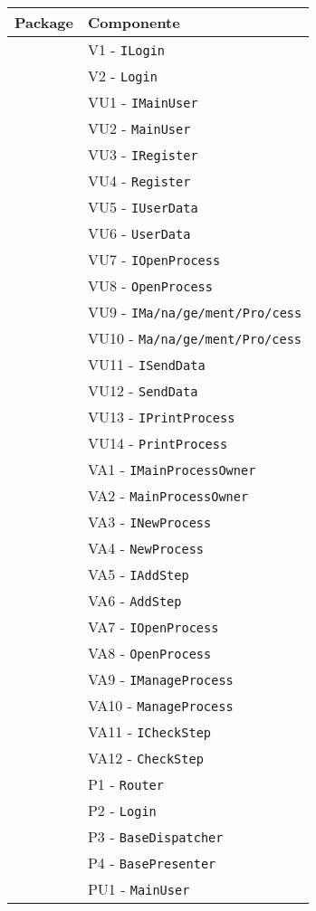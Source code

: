\begin{longtable}{XX}
\toprule
\textbf{Package} & \textbf{Componente}\\
\midrule
\view{}&V1 - \texttt{ILogin}\\ 
&V2 - \texttt{Login}\\ 
\midrule
\viewUser{}&VU1 - \texttt{IMainUser}\\
&VU2 - \texttt{MainUser}\\
&VU3 - \texttt{IRegister}\\
&VU4 - \texttt{Register}\\
&VU5 - \texttt{IUserData}\\
&VU6 - \texttt{UserData}\\
&VU7 - \texttt{IOpenProcess}\\ 
&VU8 - \texttt{OpenProcess}\\ 
&VU9 - \texttt{IMa\fshyp{}na\fshyp{}ge\fshyp{}ment\fshyp{}Pro\fshyp{}cess}\\ 
&VU10 - \texttt{Ma\fshyp{}na\fshyp{}ge\fshyp{}ment\fshyp{}Pro\fshyp{}cess}\\ 
&VU11 - \texttt{ISendData}\\ 
&VU12 - \texttt{SendData}\\
&VU13 - \texttt{IPrintProcess}\\ 
&VU14 - \texttt{PrintProcess}\\ 
\midrule
\viewAdmin{}&VA1 - \texttt{IMainProcessOwner}\\
&VA2 - \texttt{MainProcessOwner}\\
&VA3 - \texttt{INewProcess}\\ 
&VA4 - \texttt{NewProcess}\\ 
&VA5 - \texttt{IAddStep}\\ 
&VA6 - \texttt{AddStep}\\ 
&VA7 - \texttt{IOpenProcess}\\ 
&VA8 - \texttt{OpenProcess}\\ 
&VA9 - \texttt{IManageProcess}\\ 
&VA10 - \texttt{ManageProcess}\\ 
&VA11 - \texttt{ICheckStep}\\ 
&VA12 - \texttt{CheckStep}\\ 
\midrule
\logic{} &P1 - \texttt{Router}\\ 
&P2 - \texttt{Login}\\ 
&P3 - \texttt{BaseDispatcher}\\
&P4 - \texttt{BasePresenter}\\  
\logicUser{}&PU1 - \texttt{MainUser}\\ 

\end{longtable}

